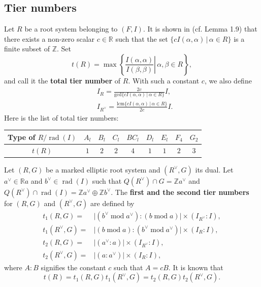 \documentclass[11pt]{amsart}
\newcommand{\R}{\mathbb{R}}
\newcommand{\Z}{\mathbb{Z}}
\newcommand{\rad}{\operatorname{rad}}
\begin{document}
\subsection{Tier numbers}\label{sect_tier-number}
Let $R$ be a root system belonging to $(F, I)$. It is shown in \cite{Saito1985}
 (cf. Lemma 1.9) that 
there exists a non-zero scalar $c \in \R$ such that the set 
$\{ cI(\alpha, \alpha) \, \vert \, \alpha \in R\}$ is a finite subset of $\Z$. Set
\[ t(R)=\max\left\{ \left. \frac{I(\alpha, \alpha)}{I(\beta,\beta)} \right\vert\, \alpha, 
\beta \in R\right\},  \]
and call it the \textbf{total tier number} of $R$. 
With such a constant $c$, we also 
define
\begin{equation}\label{def_normalized-form}
\begin{split}
&I_R=\frac{2c}{\mathrm{gcd}\{ cI(\alpha, \alpha)\, \vert \, \alpha \in R\}}I, \\
&I_{R^\vee}=\frac{\mathrm{lcm}\{ cI(\alpha, \alpha)\, \vert \, \alpha \in R\}}{2c}I.
\end{split}
\end{equation}
Here is the list of total tier numbers: \\

\begin{center}
\begin{tabular}{|c||c|c|c|c|c|c|c|c|} \hline
Type of $R/\rad(I)$ & $A_l$ & $B_l$ & $C_l$ & $BC_l$ & $D_l$ & $E_l$ & $F_4$ & 
$G_2$ \\ \hline
$t(R)$ & $1$ & $2 $ & $2$ & $4$ & $1$ & $1$ & $2$ & $3$ \\ \hline
\end{tabular}
\end{center}
\vskip 0.1in

Let $(R,G)$ be a marked elliptic root system and $(R^\vee, G)$ its dual. Let 
$a^\vee \in \R a$ and $b^\vee \in \rad(I)$ such that $Q(R^\vee) \cap G=\Z a^\vee$ 
and $Q(R^\vee) \cap \rad(I)=\Z a^\vee \oplus \Z b^\vee$. 
The \textbf{first and the second tier numbers}
for $(R,G)$ and 
$(R^\vee,G)$ are 
defined by
\begin{align*}
t_1(R,G)=
&\vert (b^\vee \; \mathrm{mod}\; a^\vee) : (b\; \mathrm{mod}\;a)\vert \times 
(I_{R^\vee}:I), \\
t_1(R^\vee,G)=
&\vert (b\; \mathrm{mod}\;a) : (b^\vee\; \mathrm{mod}\;a^\vee)\vert \times (I_{R}:I), \\
t_2(R,G)=
&\vert (a^\vee: a) \vert \times  (I_{R^\vee}:I), \\
t_2(R^\vee,G)=
&\vert (a: a^\vee) \vert \times  (I_{R}:I),
\end{align*}
where $A : B$ signifies the constant $c$ such that $A=cB$. 
It is known that 
\[ t(R)=t_1(R,G)t_1(R^\vee,G)=t_2(R,G)t_2(R^\vee,G). \]
\end{document}
